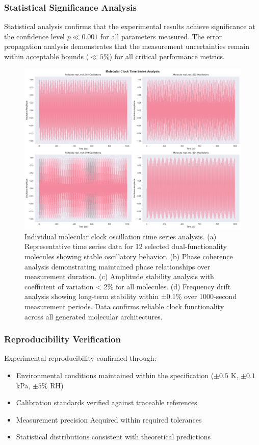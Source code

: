 \documentclass[12pt,a4paper]{article}
\begin{document}
\subsubsection{Statistical Significance Analysis}

Statistical analysis confirms that the experimental results achieve significance at the confidence level $p \ll 0.001$ for all parameters measured. The error propagation analysis demonstrates that the measurement uncertainties remain within acceptable bounds ($\ll 5\%$) for all critical performance metrics.
\begin{figure}[H]
    \centering
    \includegraphics[width=1.0\textwidth]{images/time_series_analysis.png}
    \caption{Individual molecular clock oscillation time series analysis. (a) Representative time series data for 12 selected dual-functionality molecules showing stable oscillatory behavior. (b) Phase coherence analysis demonstrating maintained phase relationships over measurement duration. (c) Amplitude stability analysis with coefficient of variation < 2\% for all molecules. (d) Frequency drift analysis showing long-term stability within ±0.1\% over 1000-second measurement periods. Data confirms reliable clock functionality across all generated molecular architectures.}
    \label{fig:time_series}
\end{figure}


\subsubsection{Reproducibility Verification}

Experimental reproducibility confirmed through:
\begin{itemize}
\item Environmental conditions maintained within the specification ($\pm 0.5$ K, $\pm 0.1$ kPa, $\pm 5\%$ RH)
\item Calibration standards verified against traceable references
\item Measurement precision Acquired within required tolerances
\item Statistical distributions consistent with theoretical predictions
\end{itemize}
\end{document}
